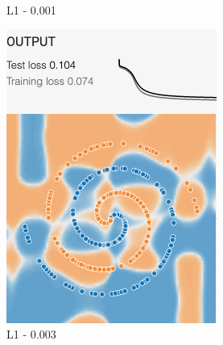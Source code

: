 \documentclass[12pt,a4paper]{article}
\begin{document}
\begin{enumerate}
\begin{figure}[H]
\begin{subfigure}[H]{0.2\textwidth}
				\caption{L1 - 0.001}
			\end{subfigure}
			\begin{subfigure}[H]{0.2\textwidth}
				\centering
				\includegraphics[width=\textwidth]{Figures/reg/L0003}
				\caption{L1 - 0.003}
			\end{subfigure}
			\begin{subfigure}[H]{0.2\textwidth}
				\centering

\end{subfigure}
\end{figure}
\end{enumerate}
\end{document}
